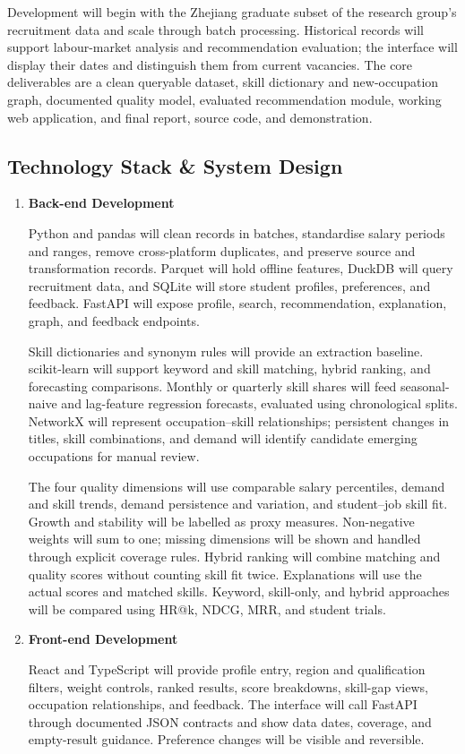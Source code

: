 \documentclass[a4paper,12pt]{article}
\begin{document}
Development will begin with the Zhejiang graduate subset of the research group's recruitment data and scale through batch processing. Historical records will support labour-market analysis and recommendation evaluation; the interface will display their dates and distinguish them from current vacancies. The core deliverables are a clean queryable dataset, skill dictionary and new-occupation graph, documented quality model, evaluated recommendation module, working web application, and final report, source code, and demonstration.

\subsection{Technology Stack \& System Design}
\begin{enumerate}
  \item \textbf{Back-end Development}\par
  Python and pandas will clean records in batches, standardise salary periods and ranges, remove cross-platform duplicates, and preserve source and transformation records. Parquet will hold offline features, DuckDB will query recruitment data, and SQLite will store student profiles, preferences, and feedback. FastAPI will expose profile, search, recommendation, explanation, graph, and feedback endpoints.

  Skill dictionaries and synonym rules will provide an extraction baseline. scikit-learn will support keyword and skill matching, hybrid ranking, and forecasting comparisons. Monthly or quarterly skill shares will feed seasonal-naive and lag-feature regression forecasts, evaluated using chronological splits. NetworkX will represent occupation--skill relationships; persistent changes in titles, skill combinations, and demand will identify candidate emerging occupations for manual review.

  The four quality dimensions will use comparable salary percentiles, demand and skill trends, demand persistence and variation, and student--job skill fit. Growth and stability will be labelled as proxy measures. Non-negative weights will sum to one; missing dimensions will be shown and handled through explicit coverage rules. Hybrid ranking will combine matching and quality scores without counting skill fit twice. Explanations will use the actual scores and matched skills. Keyword, skill-only, and hybrid approaches will be compared using HR@k, NDCG, MRR, and student trials.

  \item \textbf{Front-end Development}\par
  React and TypeScript will provide profile entry, region and qualification filters, weight controls, ranked results, score breakdowns, skill-gap views, occupation relationships, and feedback. The interface will call FastAPI through documented JSON contracts and show data dates, coverage, and empty-result guidance. Preference changes will be visible and reversible.
\end{enumerate}
\end{document}
